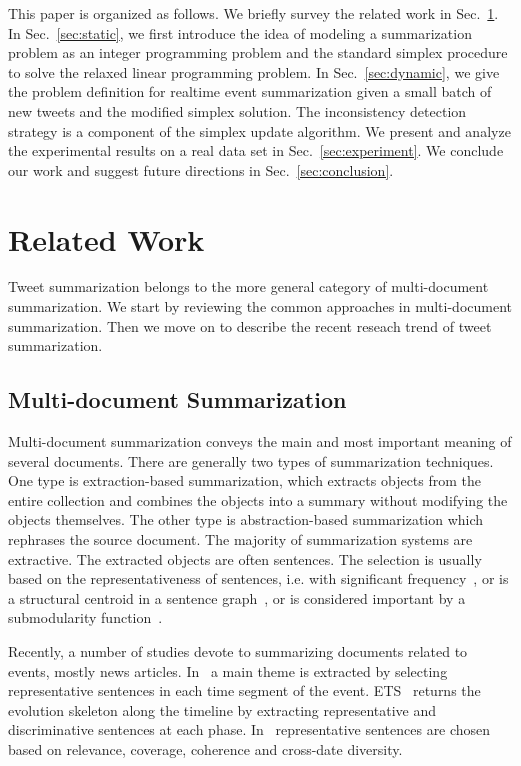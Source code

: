 \documentclass{llncs}
\begin{document}
This paper is organized as follows. We briefly survey the related work in Sec.~\ref{sec:related}. In Sec.~\ref{sec:static}, we first introduce the idea of modeling a summarization problem as an integer programming problem and the standard simplex procedure to solve the relaxed linear programming problem. In Sec.~\ref{sec:dynamic}, we give the problem definition for realtime event summarization given a small batch of new tweets and the modified simplex solution. The inconsistency detection strategy is a component of the simplex update algorithm. We present and analyze the experimental results on a real data set in Sec.~\ref{sec:experiment}. We conclude our work and suggest future directions in Sec.~\ref{sec:conclusion}.

\section{Related Work}\label{sec:related}
Tweet summarization belongs to the more general category of multi-document summarization. We start by reviewing the common approaches in multi-document summarization. Then we move on to describe the recent reseach trend of tweet summarization.

\subsection{Multi-document Summarization}
Multi-document summarization conveys the main and most important meaning of several documents. There are generally two types of summarization techniques. One type is extraction-based summarization, which extracts objects from the entire collection and combines the objects into a summary without modifying the objects themselves. The other type is abstraction-based summarization which rephrases the source document. The majority of summarization systems are extractive. The extracted objects are often sentences. The selection is usually based on the representativeness of sentences, i.e. with significant frequency~\cite{Yih2007Multi-document}, or is a structural centroid in a sentence graph~\cite{Kumar2004Graph,Lin2012Generating}, or is considered important by a submodularity function~\cite{Li2011MSSF}. 

Recently, a number of studies devote to summarizing documents related to events, mostly news articles. In~\cite{Lin2008Storyline-based} a main theme is extracted by selecting representative sentences in each time segment of the event. ETS~\cite{Wang2009Evolutionary} returns the evolution skeleton along the timeline by extracting representative and discriminative sentences at each phase. In~\cite{Yan2011Evolutionary} representative sentences are chosen based on relevance, coverage, coherence and cross-date diversity.
\end{document}
